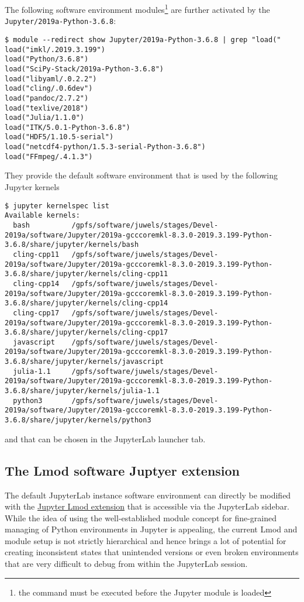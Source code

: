 The following software environment modules\footnote{the command must be executed before the Jupyter module is loaded} are further activated by the \verb|Jupyter/2019a-Python-3.6.8|:
%
\begin{verbatim}
$ module --redirect show Jupyter/2019a-Python-3.6.8 | grep "load("
load("imkl/.2019.3.199")
load("Python/3.6.8")
load("SciPy-Stack/2019a-Python-3.6.8")
load("libyaml/.0.2.2")
load("cling/.0.6dev")
load("pandoc/2.7.2")
load("texlive/2018")
load("Julia/1.1.0")
load("ITK/5.0.1-Python-3.6.8")
load("HDF5/1.10.5-serial")
load("netcdf4-python/1.5.3-serial-Python-3.6.8")
load("FFmpeg/.4.1.3")
\end{verbatim}
%
They provide the default software environment that is used by the following Jupyter kernels
%
\begin{verbatim}
$ jupyter kernelspec list
Available kernels:
  bash          /gpfs/software/juwels/stages/Devel-2019a/software/Jupyter/2019a-gcccoremkl-8.3.0-2019.3.199-Python-3.6.8/share/jupyter/kernels/bash
  cling-cpp11   /gpfs/software/juwels/stages/Devel-2019a/software/Jupyter/2019a-gcccoremkl-8.3.0-2019.3.199-Python-3.6.8/share/jupyter/kernels/cling-cpp11
  cling-cpp14   /gpfs/software/juwels/stages/Devel-2019a/software/Jupyter/2019a-gcccoremkl-8.3.0-2019.3.199-Python-3.6.8/share/jupyter/kernels/cling-cpp14
  cling-cpp17   /gpfs/software/juwels/stages/Devel-2019a/software/Jupyter/2019a-gcccoremkl-8.3.0-2019.3.199-Python-3.6.8/share/jupyter/kernels/cling-cpp17
  javascript    /gpfs/software/juwels/stages/Devel-2019a/software/Jupyter/2019a-gcccoremkl-8.3.0-2019.3.199-Python-3.6.8/share/jupyter/kernels/javascript
  julia-1.1     /gpfs/software/juwels/stages/Devel-2019a/software/Jupyter/2019a-gcccoremkl-8.3.0-2019.3.199-Python-3.6.8/share/jupyter/kernels/julia-1.1
  python3       /gpfs/software/juwels/stages/Devel-2019a/software/Jupyter/2019a-gcccoremkl-8.3.0-2019.3.199-Python-3.6.8/share/jupyter/kernels/python3
\end{verbatim}
%
and that can be chosen in the JupyterLab launcher tab.

\subsection{The Lmod software Juptyer extension}
\label{sect:lmod-use-and-problems}

The default JupyterLab instance software environment can directly be modified with the \href{https://github.com/cmd-ntrf/jupyter-lmod}{Jupyter Lmod extension} that is accessible via the JupyterLab sidebar.
While the idea of using the well-established module concept for fine-grained managing of Python environments in Jupyter is appealing, the current Lmod and module setup is not strictly hierarchical and hence brings a lot of potential for creating inconsistent states that unintended versions or even broken environments that are very difficult to debug from within the JupyterLab session.

